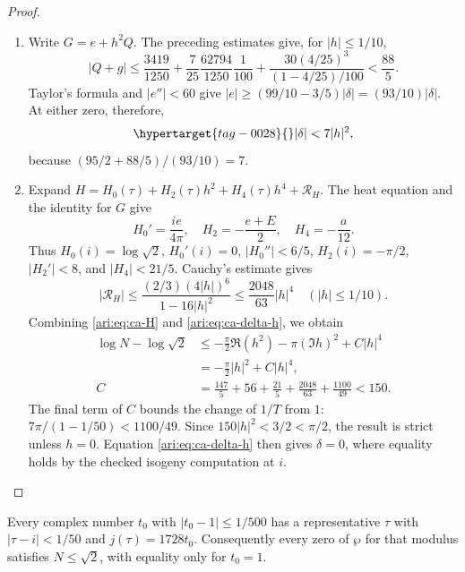 \begin{proof}
\begin{enumerate}[label=\arabic*.,leftmargin=*]
\item Write $G=e+h^2Q$. The preceding estimates give, for $|h|\le1/10$,
\[
 |Q+g|\le
 \frac{3419}{1250}+\frac7{25}\frac{62794}{1250}\frac1{100}
       +\frac{30(4/25)^3}{(1-4/25)/100}<\frac{88}{5}.
\]
Taylor's formula and $|e''|<60$ give
$|e|\ge(99/10-3/5)|\delta|=(93/10)|\delta|$.
At either zero, therefore,
\begin{equation}\hypertarget{tag-0028}{}\label{ari:eq:ca-delta-h}
 |\delta|<7|h|^2,
\end{equation}
because $(95/2+88/5)/(93/10)=7$.

\item Expand
$H=H_0(\tau)+H_2(\tau)h^2+H_4(\tau)h^4+\mathcal R_H$.
The heat equation and the identity for $G$ give
\[
 H_0'=\frac{ie}{4\pi},\quad
 H_2=-\frac{e+E}{2},\quad H_4=-\frac a{12}.
\]
Thus $H_0(i)=\log\sqrt2$, $H_0'(i)=0$,
$|H_0''|<6/5$, $H_2(i)=-\pi/2$, $|H_2'|<8$, and
$|H_4|<21/5$. Cauchy's estimate gives
\[
 |\mathcal R_H|\le
 \frac{(2/3)(4|h|)^6}{1-16|h|^2}
 \le\frac{2048}{63}|h|^4
 \quad (|h|\le1/10).
\]
Combining \eqref{ari:eq:ca-H} and \eqref{ari:eq:ca-delta-h}, we obtain
\begin{align*}
 \log N-\log\sqrt2
 &\le-\frac\pi2\Re(h^2)-\pi(\Im h)^2+C|h|^4\\
 &=-\frac\pi2|h|^2+C|h|^4,\\
 C&=\frac{147}{5}+56+\frac{21}{5}
                 +\frac{2048}{63}+\frac{1100}{49}<150.
\end{align*}
The final term of $C$ bounds the change of $1/T$ from $1$:
$7\pi/(1-1/50)<1100/49$. Since $150|h|^2<3/2<\pi/2$,
the result is strict unless $h=0$. Equation
\eqref{ari:eq:ca-delta-h} then gives $\delta=0$, where equality
holds by the checked isogeny computation at $i$.
\end{enumerate}
\end{proof}

\begin{proposition}\hypertarget{tag-001R}{}\label{ari:C.8.3}

Every complex number $t_0$ with $|t_0-1|\le1/500$ has a
representative $\tau$ with $|\tau-i|<1/50$ and $j(\tau)=1728t_0$.
Consequently every zero of $\wp$ for that modulus satisfies
$N\le\sqrt2$, with equality only for $t_0=1$.
\end{proposition}


